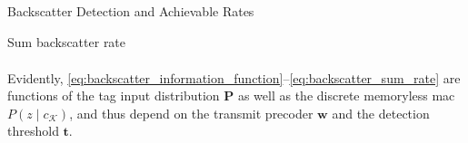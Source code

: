 \documentclass[journal]{IEEEtran}
\begin{document}
\begin{section}{Backscatter Detection and Achievable Rates}
\begin{subsection}{Sum backscatter rate}
\begin{subequations}
\begin{align}
				\end{align}
				\label{eq:backscatter_sum_rate}
			\end{subequations}

			Evidently, \eqref{eq:backscatter_information_function}--\eqref{eq:backscatter_sum_rate} are functions of the tag input distribution $\boldsymbol{P}$ as well as the discrete memoryless \gls{mac} $P(z \mid c_{\mathcal{K}})$, and thus depend on the transmit precoder $\boldsymbol{w}$ and the detection threshold $\boldsymbol{t}$.
		\end{subsection}


\end{section}
\end{document}
